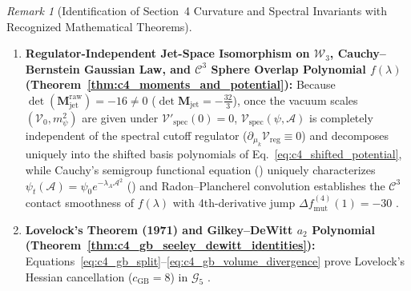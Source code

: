\documentclass[11pt,a4paper]{article}
\newcommand{\catD}{\text{\textbf{\textcolor{blue!75!black}{[D]}}}}
\newcommand{\catH}{\text{\textbf{\textcolor{orange!80!black}{[H]}}}}
\theoremstyle{definition}
\theoremstyle{plain}
\theoremstyle{remark}
\newtheorem{remark}[axiom]{Remark}
\begin{document}
\begin{remark}[Identification of Section~4 Curvature and Spectral Invariants with Recognized Mathematical Theorems]
\begin{enumerate}[label=\arabic*.]
  \item \textbf{Regulator-Independent Jet-Space Isomorphism on $\mathcal{W}_3$, Cauchy--Bernstein Gaussian Law, and $\mathcal{C}^3$ Sphere Overlap Polynomial $f(\lambda)$ (Theorem~\ref{thm:c4_moments_and_potential}):} Because $\det(\mathbf{M}_{\mathrm{jet}}^{\mathrm{raw}}) = -16 \neq 0$ ($\det\mathbf{M}_{\mathrm{jet}} = -\frac{32}{3}$), once the vacuum scales $(\mathcal{V}_0, m_\psi^2)$ are given under $\mathcal{V}'_{\mathrm{spec}}(0)=0$, $\mathcal{V}_{\mathrm{spec}}(\psi, \mathcal{A})$ is completely independent of the spectral cutoff regulator ($\partial_{\mu_k}\mathcal{V}_{\mathrm{reg}} \equiv 0$) and decomposes uniquely into the shifted basis polynomials of Eq.~\eqref{eq:c4_shifted_potential}, while Cauchy's semigroup functional equation (\catH) uniquely characterizes $\psi_t(\mathcal{A}) = \psi_0 e^{-\lambda_A\mathcal{A}^2}$ (\catD) and Radon--Plancherel convolution establishes the $\mathcal{C}^3$ contact smoothness of $f(\lambda)$ with 4th-derivative jump $\Delta f_{\mathrm{mut}}^{(4)}(1) = -30$ \catD.
  \item \textbf{Lovelock's Theorem (1971) and Gilkey--DeWitt $a_2$ Polynomial (Theorem~\ref{thm:c4_gb_seeley_dewitt_identities}):} Equations~\eqref{eq:c4_gb_split}--\eqref{eq:c4_gb_volume_divergence} prove Lovelock's Hessian cancellation ($c_{\mathrm{GB}} = 8$) in $\mathcal{G}_5$ \cite{Lovelock1971,Gilkey1995} \catD.
\end{enumerate}
\end{remark}
\end{document}
